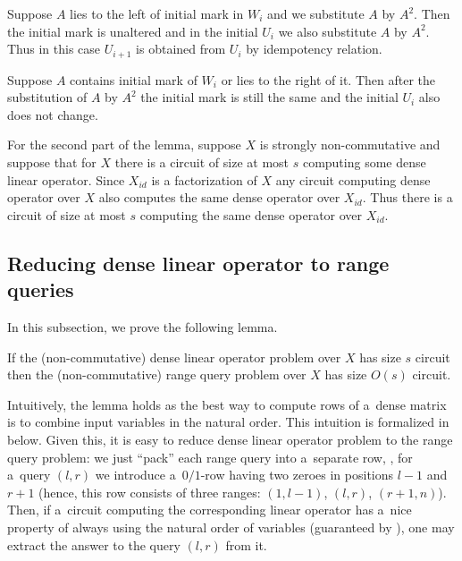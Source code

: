 \documentclass{toc}
\begin{document}
Suppose $A$ lies to the left of initial mark in $W_i$ and we substitute $A$ by $A^2$. Then the initial mark is unaltered and in the initial $U_i$ we also substitute $A$ by $A^2$. Thus in this case $U_{i+1}$ is obtained from $U_i$ by idempotency relation.

Suppose $A$ contains initial mark of $W_i$ or lies to the right of it. Then after the substitution of $A$ by $A^2$ the initial mark is still the same and the initial $U_i$ also does not change.


For the second part of the lemma, suppose $X$ is strongly non-commutative and suppose that for $X$ there is a circuit of size at most $s$ computing some dense linear operator.
Since $X_{id}$ is a factorization of $X$ any circuit computing dense operator over $X$ also computes the same dense operator over $X_{id}$. Thus there is a  circuit of size at most $s$ computing the same dense operator over $X_{id}$.

\subsection{Reducing dense linear operator to range queries} \label{sec:operators_to_queries}
In this subsection, we prove the following lemma.

\begin{lemma} \label{lem:dense_matrices}
    If the (non-commutative) dense linear operator problem over $X$ has size $s$
    circuit then the (non-commutative)
    range query
    problem over $X$ has size
    $O(s)$ circuit.
\end{lemma}

Intuitively, the lemma holds as the best way to compute rows of a~dense matrix is to combine input variables in the natural order. This intuition is formalized in  below. Given this, it is easy to reduce dense linear operator problem to the
range query
problem: we just ``pack'' each range query into a~separate row, \ie, for a~query $(l,r)$ we introduce a~$0/1$-row having two zeroes in positions $l-1$ and $r+1$ (hence, this row consists of three ranges: $(1,l-1)$, $(l,r)$, $(r+1,n)$). Then, if a~circuit computing the corresponding linear operator has a~nice property of always using the natural order of variables (guaranteed by ), one may extract the answer to the query $(l,r)$ from it.
\end{document}
